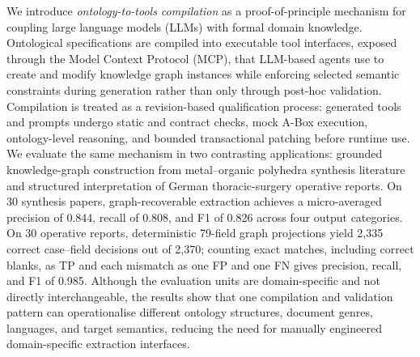 


We introduce \emph{ontology-to-tools compilation} as a proof-of-principle mechanism for coupling large language models (LLMs) with formal domain knowledge. Ontological specifications are compiled into executable tool interfaces, exposed through the Model Context Protocol (MCP), that LLM-based agents use to create and modify knowledge graph instances while enforcing selected semantic constraints during generation rather than only through post-hoc validation. Compilation is treated as a revision-based qualification process: generated tools and prompts undergo static and contract checks, mock A-Box execution, ontology-level reasoning, and bounded transactional patching before runtime use. We evaluate the same mechanism in two contrasting applications: grounded knowledge-graph construction from metal--organic polyhedra synthesis literature and structured interpretation of German thoracic-surgery operative reports. On 30 synthesis papers, graph-recoverable extraction achieves a micro-averaged precision of 0.844, recall of 0.808, and F1 of 0.826 across four output categories. On 30 operative reports, deterministic 79-field graph projections yield 2{,}335 correct case--field decisions out of 2{,}370; counting exact matches, including correct blanks, as TP and each mismatch as one FP and one FN gives precision, recall, and F1 of 0.985. Although the evaluation units are domain-specific and not directly interchangeable, the results show that one compilation and validation pattern can operationalise different ontology structures, document genres, languages, and target semantics, reducing the need for manually engineered domain-specific extraction interfaces.

